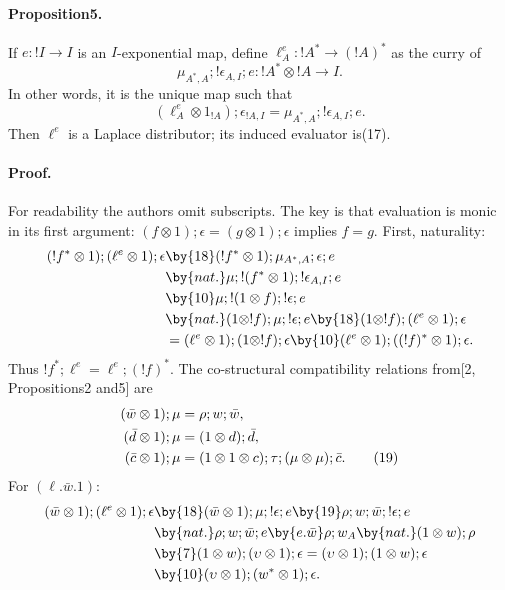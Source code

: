 \paragraph{Proposition5.}
If $e:!I\to I$ is an $I$-exponential map, define
$\ell_A^e:!A^*\to(!A)^*$ as the curry of
\begin{equation}
\mu_{A^*,A};!\epsilon_{A,I};e:!A^*\otimes!A\to I.\tag{17}
\end{equation}
In other words, it is the unique map such that
\begin{equation}
(\ell_A^e\otimes1_{!A});\epsilon_{!A,I}
=\mu_{A^*,A};!\epsilon_{A,I};e.\tag{18}
\end{equation}
Then $\ell^e$ is a Laplace distributor; its induced evaluator is(17).
\paragraph{Proof.}
For readability the authors omit subscripts. The key is that evaluation is
monic in its first argument: $(f\otimes1);\epsilon=(g\otimes1);\epsilon$
implies $f=g$. First, naturality:
\begin{align*}
(!f^*\otimes1);(\ell^e\otimes1);\epsilon
&\by{18}(!f^*\otimes1);\mu_{A^*,A};\epsilon;e\\
&\by{nat.}\mu;!(f^*\otimes1);!\epsilon_{A,I};e\\
&\by{10}\mu;!(1\otimes f);!\epsilon;e\\
&\by{nat.}(1\otimes!f);\mu;!\epsilon;e
\by{18}(1\otimes!f);(\ell^e\otimes1);\epsilon\\
&=(\ell^e\otimes1);(1\otimes!f);\epsilon
\by{10}(\ell^e\otimes1);((!f)^*\otimes1);\epsilon.
\end{align*}
Thus $!f^*;\ell^e=\ell^e;(!f)^*$.
The co-structural compatibility relations from[2, Propositions2 and5] are
\begin{align}
(\bar w\otimes1);\mu&=\rho;w;\bar w,\notag\\
(\bar d\otimes1);\mu&=(1\otimes d);\bar d,\notag\\
(\bar c\otimes1);\mu&=(1\otimes1\otimes c);\tau;(\mu\otimes\mu);\bar c.\tag{19}
\end{align}
For $(\ell.\bar w.1)$:
\begin{align*}
(\bar w\otimes1);(\ell^e\otimes1);\epsilon
&\by{18}(\bar w\otimes1);\mu;!\epsilon;e
\by{19}\rho;w;\bar w;!\epsilon;e\\
&\by{nat.}\rho;w;\bar w;e
\by{e.\bar w}\rho;w_A
\by{nat.}(1\otimes w);\rho\\
&\by{7}(1\otimes w);(\upsilon\otimes1);\epsilon
=(\upsilon\otimes1);(1\otimes w);\epsilon\\
&\by{10}(\upsilon\otimes1);(w^*\otimes1);\epsilon.
\end{align*}
